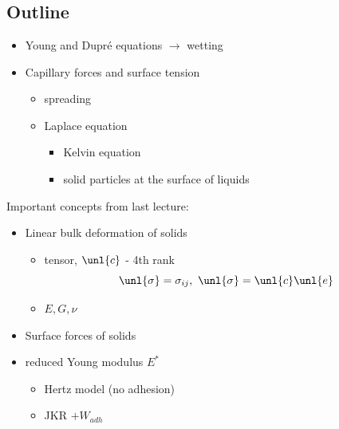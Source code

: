 \documentclass[a4paper, 11pt, normalem]{report}
\begin{document}
\chapter{}
\section{Outline}
\begin{itemize}
    \item Young and Dupr\'{e} equations $\to$ wetting
    \item Capillary forces and surface tension
        \begin{itemize}
            \item spreading
            \item Laplace equation
                \begin{itemize}
                    \item Kelvin equation
                    \item solid particles at the surface of liquids
                \end{itemize}
        \end{itemize}
\end{itemize}

Important concepts from last lecture:
\begin{itemize}
    \item Linear bulk deformation of solids
        \begin{itemize}
            \item tensor, $\unl{c}$ - 4th rank
                \begin{equation}
                    \unl{\sigma} = \sigma_{ij},~ \unl{\sigma} = \unl{c}\unl{e}
                \end{equation}
            \item $E,G,\nu$
        \end{itemize}
    \item Surface forces of solids
    \item reduced Young modulus $E^*$
        \begin{itemize}
            \item Hertz model (no adhesion)
            \item JKR $+ W_{adh}$
        \end{itemize}
\end{itemize}
\end{document}
